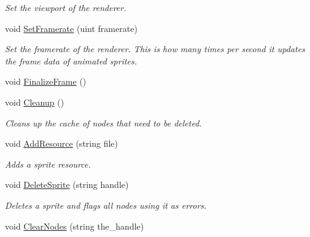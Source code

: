 \begin{DoxyCompactItemize}
\begin{DoxyCompactList}\small\item\em Set the viewport of the renderer. \item\end{DoxyCompactList}\item 
\hypertarget{classMob2D_aa353f0ee96bddabebd7ce90e12a8c7bc}{
void \hyperlink{classMob2D_aa353f0ee96bddabebd7ce90e12a8c7bc}{SetFramerate} (uint framerate)}
\label{classMob2D_aa353f0ee96bddabebd7ce90e12a8c7bc}

\begin{DoxyCompactList}\small\item\em Set the framerate of the renderer. This is how many times per second it updates the frame data of animated sprites. \item\end{DoxyCompactList}\item 
void \hyperlink{classMob2D_ab18c40a9be87387c4bfa3cfe336ff36e}{FinalizeFrame} ()
\item 
\hypertarget{classMob2D_aef216d8f68f30f8f116829c1ebba00ce}{
void \hyperlink{classMob2D_aef216d8f68f30f8f116829c1ebba00ce}{Cleanup} ()}
\label{classMob2D_aef216d8f68f30f8f116829c1ebba00ce}

\begin{DoxyCompactList}\small\item\em Cleans up the cache of nodes that need to be deleted. \item\end{DoxyCompactList}\item 
\hypertarget{classMob2D_ad924bf9e07335af32176c15f73aa2a8d}{
void \hyperlink{classMob2D_ad924bf9e07335af32176c15f73aa2a8d}{AddResource} (string file)}
\label{classMob2D_ad924bf9e07335af32176c15f73aa2a8d}

\begin{DoxyCompactList}\small\item\em Adds a sprite resource. \item\end{DoxyCompactList}\item 
\hypertarget{classMob2D_acadf6699752f40183ec283f97b0c5193}{
void \hyperlink{classMob2D_acadf6699752f40183ec283f97b0c5193}{DeleteSprite} (string handle)}
\label{classMob2D_acadf6699752f40183ec283f97b0c5193}

\begin{DoxyCompactList}\small\item\em Deletes a sprite and flags all nodes using it as errors. \item\end{DoxyCompactList}\item 
\hypertarget{classMob2D_a85ffff0c2e135b00da738cecef283bda}{
void \hyperlink{classMob2D_a85ffff0c2e135b00da738cecef283bda}{ClearNodes} (string the\_\-handle)}
\label{classMob2D_a85ffff0c2e135b00da738cecef283bda}


\end{DoxyCompactItemize}
